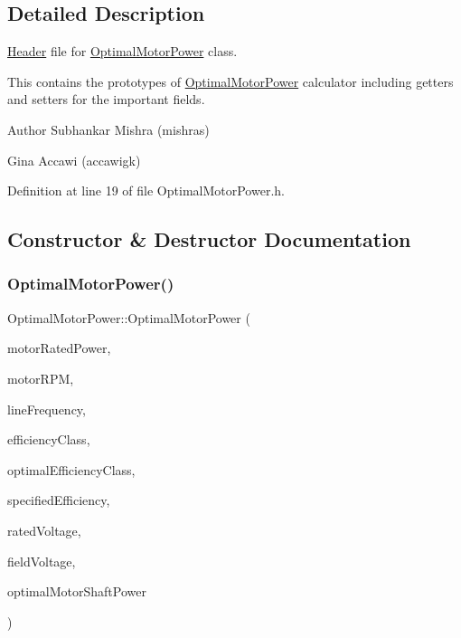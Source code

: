 \subsection{Detailed Description}
\hyperlink{class_header}{Header} file for \hyperlink{class_optimal_motor_power}{Optimal\+Motor\+Power} class. 

This contains the prototypes of \hyperlink{class_optimal_motor_power}{Optimal\+Motor\+Power} calculator including getters and setters for the important fields.

\begin{DoxyAuthor}{Author}
Subhankar Mishra (mishras) 

Gina Accawi (accawigk) 
\end{DoxyAuthor}


Definition at line 19 of file Optimal\+Motor\+Power.\+h.



\subsection{Constructor \& Destructor Documentation}
\mbox{\label{class_optimal_motor_power_a5fb4541ee91c6cdc2a5252f9ccce445d}} 
\subsubsection{\texorpdfstring{Optimal\+Motor\+Power()}{OptimalMotorPower()}}
{\footnotesize\ttfamily Optimal\+Motor\+Power\+::\+Optimal\+Motor\+Power (\begin{DoxyParamCaption}\item[{double}]{motor\+Rated\+Power,  }\item[{double}]{motor\+R\+PM,  }\item[{Motor\+::\+Line\+Frequency}]{line\+Frequency,  }\item[{Motor\+::\+Efficiency\+Class}]{efficiency\+Class,  }\item[{Motor\+::\+Efficiency\+Class}]{optimal\+Efficiency\+Class,  }\item[{double}]{specified\+Efficiency,  }\item[{double}]{rated\+Voltage,  }\item[{double}]{field\+Voltage,  }\item[{double}]{optimal\+Motor\+Shaft\+Power }\end{DoxyParamCaption})\hspace{0.3cm}{\ttfamily [inline]}}

